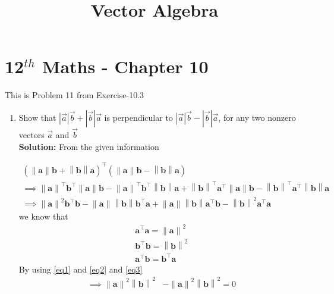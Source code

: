 \documentclass[10pt]{article}
\providecommand{\brak}[1]{\ensuremath{\left(#1\right)}}
\newcommand{\solution}{\noindent \textbf{Solution: }}
\providecommand{\norm}[1]{\left\lVert#1\right\rVert}
\providecommand{\abs}[1]{\left\vert#1\right\vert}
\let\vec\mathbf{}
\begin{document}
\begin{center}
\title{\textbf{Vector Algebra}}
\date{\vspace{-5ex}} %
\maketitle
\end{center}

\section{12$^{th}$ Maths - Chapter 10}
This is Problem 11 from Exercise-10.3
\begin{enumerate}
\item Show that $\abs{\overrightarrow{a}}\overrightarrow{b}+\abs{\overrightarrow{b}}\overrightarrow{a}$ is perpendicular to $\abs{\overrightarrow{a}}\overrightarrow{b}-\abs{\overrightarrow{b}}\overrightarrow{a}$, for any two nonzero vectors $\overrightarrow{a}$ and $\overrightarrow{b}$\\  

\solution
From the given information

\begin{align}
\brak{\norm{\vec{a}}\vec{b}+\norm{\vec{b}}\vec{a}}^\top\brak{\norm{\vec{a}}\vec{b}-\norm{\vec{b}}\vec{a}}\\
\implies \norm{\vec{a}}^\top\vec{b}^\top\norm{\vec{a}}\vec{b}-\norm{\vec{a}}^\top\vec{b}^\top\norm{\vec{b}}\vec{a}+\norm{\vec{b}}^\top\vec{a}^\top\norm{\vec{a}}\vec{b}-\norm{\vec{b}}^\top\vec{a}^\top\norm{\vec{b}}\vec{a}\\
\implies \norm{\vec{a}}^2\vec{b}^\top\vec{b}-\norm{\vec{a}}\norm{\vec{b}}\vec{b}^\top\vec{a}+\norm{\vec{a}}\norm{\vec{b}}\vec{a}^\top\vec{b}-\norm{\vec{b}}^2\vec{a}^\top\vec{a}
\end{align}
we know that
\begin{align}
    \vec{a}^{\top}\vec{a} = \norm{\vec{a}}^2
    \label{eq1}  \\
    \vec{b}^{\top}\vec{b} = \norm{\vec{b}}^2
    \label{eq2}  \\
    \vec{a}^{\top}\vec{b} = \vec{b}^{\top}\vec{a}
    \label{eq3}
\end{align}
By using \eqref{eq1} and \eqref{eq2} and \eqref{eq3}
\begin{align}
	\implies\norm{\vec{a}}^2\norm{\vec{b}}^2&-\norm{\vec{a}}^2\norm{\vec{b}}^2=0
\end{align}
\end{enumerate}
\end{document}
